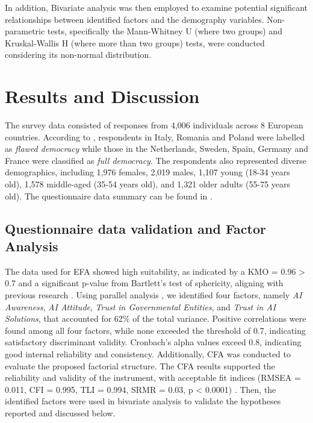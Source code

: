 \documentclass[
]{ceurart}
\begin{document}
In addition, Bivariate analysis was then employed to examine potential significant relationships between identified factors and the demography variables. Non-parametric tests, specifically the Mann-Whitney U (where two groups) \cite{mann1947test} and Kruskal-Wallis H (where more than two groups) \cite{kruskal1952use} tests, were conducted considering its non-normal distribution. %

\section{Results and Discussion}

The survey data consisted of responses from 4,006 individuals across 8 European countries. According to \cite{unit2022democracy}, respondents in Italy, Romania and Poland were labelled as  \textit{flawed democracy} while those in the Netherlands, Sweden, Spain, Germany and France were classified as \textit{full democracy}. The respondents also represented diverse demographics, including 1,976 females, 2,019 males, 1,107 young (18-34 years old), 1,578 middle-aged (35-54 years old), and 1,321 older adults (55-75 years old). The questionnaire data summary can be found in \cite{dataSummary}.

\subsection{Questionnaire data validation and Factor Analysis}
The data used for EFA showed high suitability, as indicated by a KMO = 0.96 > 0.7 and a significant p-value from Bartlett's test of sphericity, aligning with previous research \cite{kaiser1974index}.
Using parallel analysis \cite{lim2019determining}, we identified four factors, namely \textit{AI Awareness}, \textit{AI Attitude}, \textit{Trust in Governmental Entities}, and \textit{Trust in AI Solutions}, that accounted for 62\% of the total variance. Positive correlations were found among all four factors, while none exceeded the threshold of 0.7, indicating satisfactory discriminant validity.
Cronbach's alpha values exceed 0.8, indicating good internal reliability and consistency. Additionally, CFA was conducted to evaluate the proposed factorial structure. The CFA results supported the reliability and validity of the instrument, with acceptable fit indices (RMSEA = 0.011, CFI = 0.995, TLI = 0.994, SRMR = 0.03, p < 0.0001) \cite{kline2023principles}. Then, the identified factors were used in bivariate analysis to validate the hypotheses reported and discussed below.
\end{document}

